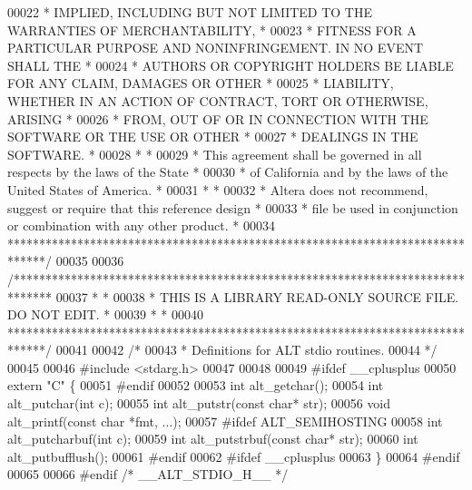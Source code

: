 \begin{DoxyCode}
00022 \textcolor{comment}{* IMPLIED, INCLUDING BUT NOT LIMITED TO THE WARRANTIES OF MERCHANTABILITY,    *}
00023 \textcolor{comment}{* FITNESS FOR A PARTICULAR PURPOSE AND NONINFRINGEMENT. IN NO EVENT SHALL THE *}
00024 \textcolor{comment}{* AUTHORS OR COPYRIGHT HOLDERS BE LIABLE FOR ANY CLAIM, DAMAGES OR OTHER      *}
00025 \textcolor{comment}{* LIABILITY, WHETHER IN AN ACTION OF CONTRACT, TORT OR OTHERWISE, ARISING     *}
00026 \textcolor{comment}{* FROM, OUT OF OR IN CONNECTION WITH THE SOFTWARE OR THE USE OR OTHER         *}
00027 \textcolor{comment}{* DEALINGS IN THE SOFTWARE.                                                   *}
00028 \textcolor{comment}{*                                                                             *}
00029 \textcolor{comment}{* This agreement shall be governed in all respects by the laws of the State   *}
00030 \textcolor{comment}{* of California and by the laws of the United States of America.              *}
00031 \textcolor{comment}{*                                                                             *}
00032 \textcolor{comment}{* Altera does not recommend, suggest or require that this reference design    *}
00033 \textcolor{comment}{* file be used in conjunction or combination with any other product.          *}
00034 \textcolor{comment}{******************************************************************************/}
00035 
00036 \textcolor{comment}{/******************************************************************************}
00037 \textcolor{comment}{*                                                                             *}
00038 \textcolor{comment}{* THIS IS A LIBRARY READ-ONLY SOURCE FILE. DO NOT EDIT.                       *}
00039 \textcolor{comment}{*                                                                             *}
00040 \textcolor{comment}{******************************************************************************/}
00041 
00042 \textcolor{comment}{/*}
00043 \textcolor{comment}{ * Definitions for ALT stdio routines.}
00044 \textcolor{comment}{ */}
00045 
00046 \textcolor{preprocessor}{#include <stdarg.h>}
00047 
00048 
00049 \textcolor{preprocessor}{#ifdef \_\_cplusplus}
00050 \textcolor{keyword}{extern} \textcolor{stringliteral}{"C"} \{
00051 \textcolor{preprocessor}{#endif}
00052 
00053 \textcolor{keywordtype}{int} alt_getchar();
00054 \textcolor{keywordtype}{int} alt_putchar(\textcolor{keywordtype}{int} c);
00055 \textcolor{keywordtype}{int} alt_putstr(\textcolor{keyword}{const} \textcolor{keywordtype}{char}* str);
00056 \textcolor{keywordtype}{void} alt_printf(\textcolor{keyword}{const} \textcolor{keywordtype}{char} *fmt, ...);
00057 \textcolor{preprocessor}{#ifdef ALT\_SEMIHOSTING}
00058 \textcolor{keywordtype}{int} alt\_putcharbuf(\textcolor{keywordtype}{int} c);
00059 \textcolor{keywordtype}{int} alt\_putstrbuf(\textcolor{keyword}{const} \textcolor{keywordtype}{char}* str);
00060 \textcolor{keywordtype}{int} alt\_putbufflush();
00061 \textcolor{preprocessor}{#endif}
00062 \textcolor{preprocessor}{#ifdef \_\_cplusplus}
00063 \}
00064 \textcolor{preprocessor}{#endif}
00065 
00066 \textcolor{preprocessor}{#endif }\textcolor{comment}{/* \_\_ALT\_STDIO\_H\_\_ */}\textcolor{preprocessor}{}
\end{DoxyCode}
